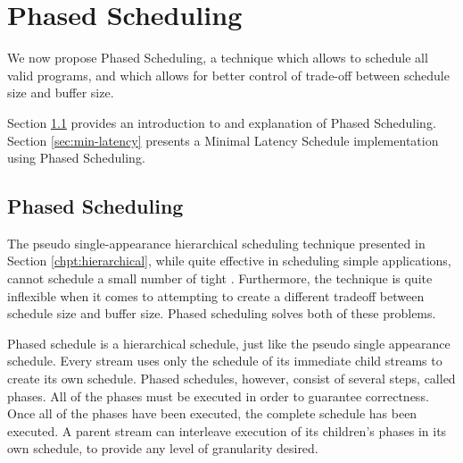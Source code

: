 \section{Phased Scheduling}
\label{chpt:phased}

We now propose Phased Scheduling, a technique which allows to
schedule all valid {\StreamIt} programs, and which allows for
better control of trade-off between schedule size and buffer size.

Section \ref{sec:phased:intro} provides an introduction to and
explanation of Phased Scheduling. Section \ref{sec:min-latency}
presents a Minimal Latency Schedule implementation using Phased
Scheduling.

\subsection{Phased Scheduling}
\label{sec:phased:intro}

The pseudo single-appearance hierarchical scheduling technique
presented in Section \ref{chpt:hierarchical}, while quite
effective in scheduling simple applications, cannot schedule a
small number of tight {{\feedbackloops}}. Furthermore, the
technique is quite inflexible when it comes to attempting to
create a different tradeoff between schedule size and buffer size.
Phased scheduling solves both of these problems.

Phased schedule is a hierarchical schedule, just like the pseudo
single appearance schedule. Every stream uses only the schedule of
its immediate child streams to create its own schedule. Phased
schedules, however, consist of several steps, called phases. All
of the phases must be executed in order to guarantee correctness.
Once all of the phases have been executed, the complete schedule
has been executed. A parent stream can interleave execution of its
children's phases in its own schedule, to provide any level of
granularity desired.

